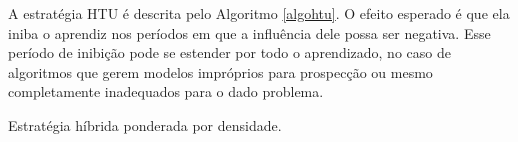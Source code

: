 A estratégia HTU é descrita pelo Algoritmo \ref{algohtu}.
O efeito esperado é que ela iniba o aprendiz nos períodos em que a influência dele possa ser negativa.
Esse período de inibição pode se estender por todo o aprendizado, no caso de algoritmos que gerem modelos impróprios para prospecção ou mesmo completamente inadequados para o dado problema.
\begin{algoritmo}
\caption{Estratégia híbrida ponderada por densidade.}
\label{algohtu}
\small
{}
\algalg{\htu{$\mathcal{U}$, $\mathcal{L}$, $\cent$}}{
 \If{$\cent = 0$}{
  \Return $\mathcal{L}$
 }
 \Else{
  $\theta = \phi(\mathcal{L})$ \\
  $\mu_{M_\theta}=\frac{1}{|\mathcal{U}|} \sum\limits_{\bm{x} \in \mathcal{U}} M_\theta(\bm{x})$ \\
  $\sigma_{M_\theta}=\frac{1}{|\mathcal{U}|} \sum\limits_{\bm{x} \in \mathcal{U}}(M_\theta(\bm{x}) - \mu_{M})^2$ \\
  $\mu_{\stratIDTU}=\frac{1}{|\mathcal{U}|} \sum\limits_{\bm{x} \in \mathcal{U}} \stratIDTU(\bm{x})$ \\
  $\sigma_{\stratIDTU}=\frac{1}{|\mathcal{U}|} \sum\limits_{\bm{x} \in \mathcal{U}}(\stratIDTU(\bm{x}) - \mu_{\stratIDTU})^2$ \\
  $\rho = (\sigma_{M_\theta}^2\cdot\sigma_{\stratIDTU}^2)^{-\frac{1}{2}} \sum\limits_{\bm{x} \in \mathcal{U}} (M_\theta(\bm{x}) - \mu_{M_\theta})(\stratIDTU(\bm{x}) - \mu_{\stratIDTU})$ \come{correlação Mar-TU}\\
}}
\end{algoritmo}
